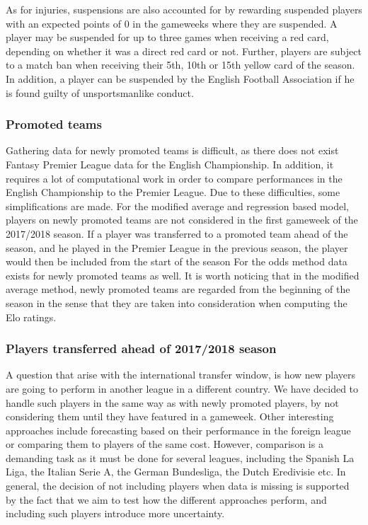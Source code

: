 \newpar

As for injuries, suspensions are also accounted for by rewarding suspended players with an expected points of 0 in the gameweeks where they are suspended. A player may be suspended for up to three games when receiving a red card, depending on whether it was a direct red card or not. Further, players are subject to a match ban when receiving their 5th, 10th or 15th yellow card of the season. In addition, a player can be suspended by the English Football Association if he is found guilty of unsportsmanlike conduct. 


\subsubsection{Promoted teams}
Gathering data for newly promoted teams is difficult, as there does not exist Fantasy Premier League data for the English Championship. In addition, it requires a lot of computational work in order to compare performances in the English Championship to the Premier League. Due to these difficulties, some simplifications are made. For the modified average and regression based model, players on newly promoted teams are not considered in the first gameweek of the 2017/2018 season. If a player was transferred to a promoted team ahead of the season, and he played in the Premier League in the previous season, the player would then be included from the start of the season For the odds method data exists for newly promoted teams as well. It is worth noticing that in the modified average method, newly promoted teams are regarded from the beginning of the season in the sense that they are taken into consideration when computing the Elo ratings. 

\subsubsection{Players transferred ahead of 2017/2018 season}
A question that arise with the international transfer window, is how new players are going to perform in another league in a different country. We have decided to handle such players in the same way as with newly promoted players, by not considering them until they have featured in a gameweek. Other interesting approaches include forecasting based on their performance in the foreign league or comparing them to players of the same cost. However, comparison is a demanding task as it must be done for several leagues, including the Spanish La Liga, the Italian Serie A, the German Bundesliga, the Dutch Eredivisie etc. In general, the decision of not including players when data is missing is supported by the fact that we aim to test how the different approaches perform, and including such players introduce more uncertainty.



